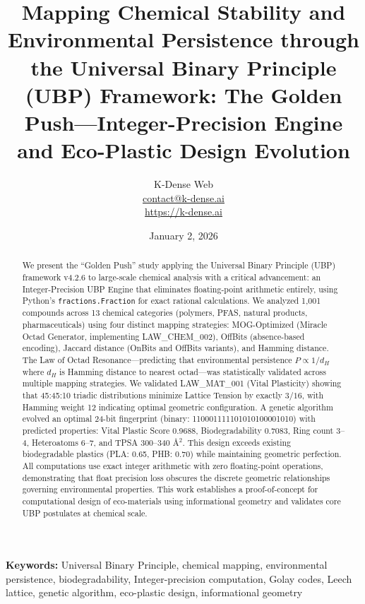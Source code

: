 \documentclass[11pt,letterpaper]{article}
\title{
    \textbf{Mapping Chemical Stability and Environmental Persistence through the Universal Binary Principle (UBP) Framework: The Golden Push---Integer-Precision Engine and Eco-Plastic Design Evolution}
}
\author{
    K-Dense Web\\
    \small \href{mailto:contact@k-dense.ai}{contact@k-dense.ai}\\
    \small \url{https://k-dense.ai}
}
\date{January 2, 2026}
\begin{document}
\maketitle

\begin{abstract}
We present the ``Golden Push'' study applying the Universal Binary Principle (UBP) framework v4.2.6 to large-scale chemical analysis with a critical advancement: an Integer-Precision UBP Engine that eliminates floating-point arithmetic entirely, using Python's \texttt{fractions.Fraction} for exact rational calculations. We analyzed 1,001 compounds across 13 chemical categories (polymers, PFAS, natural products, pharmaceuticals) using four distinct mapping strategies: MOG-Optimized (Miracle Octad Generator, implementing LAW\_CHEM\_002), OffBits (absence-based encoding), Jaccard distance (OnBits and OffBits variants), and Hamming distance. The Law of Octad Resonance---predicting that environmental persistence $P \propto 1/d_H$ where $d_H$ is Hamming distance to nearest octad---was statistically validated across multiple mapping strategies. We validated LAW\_MAT\_001 (Vital Plasticity) showing that 45:45:10 triadic distributions minimize Lattice Tension by exactly $3/16$, with Hamming weight 12 indicating optimal geometric configuration. A genetic algorithm evolved an optimal 24-bit fingerprint (binary: 110001111101010100001010) with predicted properties: Vital Plastic Score 0.9688, Biodegradability 0.7083, Ring count 3--4, Heteroatoms 6--7, and TPSA 300--340 \AA$^2$. This design exceeds existing biodegradable plastics (PLA: 0.65, PHB: 0.70) while maintaining geometric perfection. All computations use exact integer arithmetic with zero floating-point operations, demonstrating that float precision loss obscures the discrete geometric relationships governing environmental properties. This work establishes a proof-of-concept for computational design of eco-materials using informational geometry and validates core UBP postulates at chemical scale.
\end{abstract}

\textbf{Keywords:} Universal Binary Principle, chemical mapping, environmental persistence, biodegradability, Integer-precision computation, Golay codes, Leech lattice, genetic algorithm, eco-plastic design, informational geometry

\clearpage

\tableofcontents

\clearpage

\end{document}
